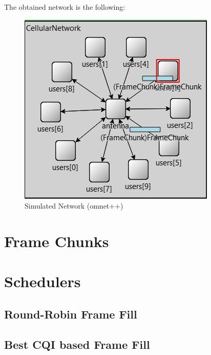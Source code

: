 \noindent The obtained network is the following: 
\begin{figure}[H]
  \centering
  \includegraphics{images/network_simulations}
  \caption{Simulated Network (omnet++)}
  \label{fig:simulated_network}
\end{figure}



\section{Frame Chunks}

\section{Schedulers}
	\subsection{Round-Robin Frame Fill}
	\subsection{Best CQI based Frame Fill}